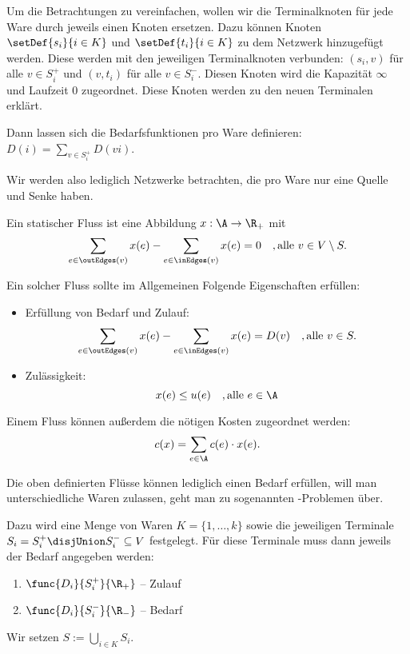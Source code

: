 \begin{remark}
    Um die Betrachtungen zu vereinfachen, wollen wir die Terminalknoten
    für jede Ware durch jeweils einen Knoten ersetzen. Dazu können
    Knoten $\setDef{s_i}{i \in K}$ und $\setDef{t_i}{i \in K}$ zu dem
    Netzwerk hinzugefügt werden. Diese werden mit den jeweiligen
    Terminalknoten verbunden: $(s_i, v)$ für alle $v \in S_i^+$ und
    $(v,t_i)$ für alle $v \in S_i^-$. Diesen Knoten wird die Kapazität $\infty$
    und Laufzeit $0$ zugeordnet. Diese Knoten werden zu den neuen Terminalen
    erklärt.

    Dann lassen sich die Bedarfsfunktionen pro Ware definieren:
    $D(i) = \sum_{v \in S_i^+} D(vi)$.

    Wir werden also lediglich Netzwerke betrachten, die pro Ware nur eine
    Quelle und Senke haben.
\end{remark}

\begin{definition}
    Ein statischer Fluss ist eine Abbildung $x : \A \rightarrow \R_+$ mit
    \[ \sum_{e \in \outEdges(v)} x(e) - \sum_{e \in \inEdges(v)} x(e) = 0
        \quad, \text{alle } v \in V \setminus S. \]

    Ein solcher Fluss sollte im Allgemeinen Folgende Eigenschaften erfüllen:
    \begin{itemize}
        \item Erfüllung von Bedarf und Zulauf:
            \[ \sum_{e \in \outEdges(v)} x(e) - \sum_{e \in \inEdges(v)} x(e) = D(v)
                \quad, \text{alle } v \in S. \]
        \item Zulässigkeit:
            \[ x(e) \leq u(e) \quad, \text{alle } e \in \A \]
    \end{itemize}

    Einem Fluss können außerdem die nötigen Kosten zugeordnet werden:
        \[ c(x) = \sum_{e \in \A} c(e) \cdot x(e). \]
\end{definition}

\begin{definition}
    Die oben definierten Flüsse können lediglich einen Bedarf erfüllen, will
    man unterschiedliche Waren zulassen, geht man zu sogenannten
    -Problemen über.

    Dazu wird eine Menge von Waren $K = \{1, \ldots, k\}$ sowie die jeweiligen
    Terminale $S_i = S_i^+ \disjUnion S_i^- \subseteq V$ festgelegt. Für diese
    Terminale muss dann jeweils der Bedarf angegeben werden:
    \begin{enumerate}
        \item $\func{D_i}{S_i^+}{\R_+}$ -- Zulauf
        \item $\func{D_i}{S_i^-}{\R_-}$ -- Bedarf
    \end{enumerate}

    Wir setzen $S := \bigcup\limits_{i \in K} S_i$.
\end{definition}

